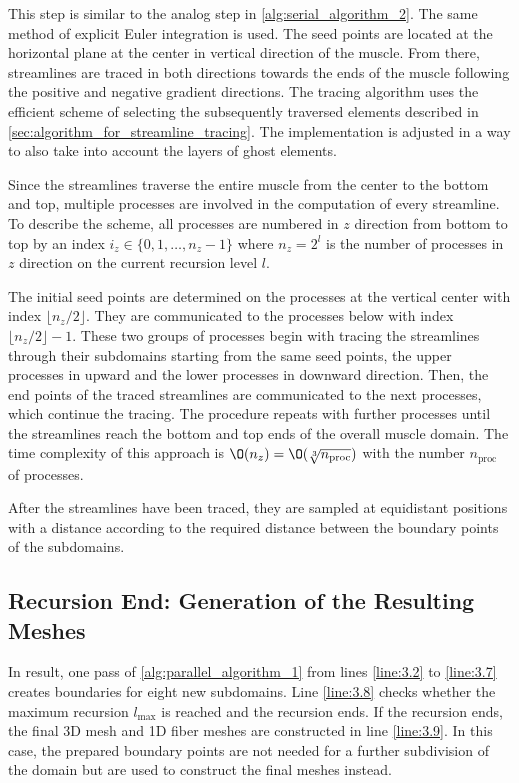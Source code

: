 This step is similar to the analog step in \cref{alg:serial_algorithm_2}. 
The same method of explicit Euler integration is used. The seed points are located at the horizontal plane at the center in vertical direction of the muscle. From there, streamlines are traced in both directions towards the ends of the muscle following the positive and negative gradient directions.
The tracing algorithm uses the efficient scheme of selecting the subsequently traversed elements described in \cref{sec:algorithm_for_streamline_tracing}. The implementation is adjusted in a way to also take into account the layers of ghost elements.

Since the streamlines traverse the entire muscle from the center to the bottom and top, multiple processes are involved in the computation of every streamline. To describe the scheme, all processes are numbered in $z$ direction from bottom to top by an index $i_z \in \{0, 1, \dots, n_z-1\}$ where $n_z = 2^l$ is the number of processes in $z$ direction on the current recursion level $l$.

The initial seed points are determined on the processes at the vertical center with index $\lfloor n_z/2\rfloor$. They are communicated to the processes below with index $\lfloor n_z/2\rfloor-1$. These two groups of processes begin with tracing the streamlines through their subdomains starting from the same seed points, the upper processes in upward and the lower processes in downward direction. Then, the end points of the traced streamlines are communicated to the next processes, which continue the tracing. The procedure repeats with further processes until the streamlines reach the bottom and top ends of the overall muscle domain.
The time complexity of this approach is $\O(n_z) = \O(\sqrt[3]{n_\text{proc}})$ with the number $n_\text{proc}$ of processes.

After the streamlines have been traced, they are sampled at equidistant positions with a distance according to the required distance between the boundary points of the subdomains.

\subsection{Recursion End: Generation of the Resulting Meshes}

In result, one pass of \cref{alg:parallel_algorithm_1} from lines \ref{line:3.2} to \ref{line:3.7} creates boundaries for eight new subdomains. Line \ref{line:3.8} checks whether the maximum recursion $l_\text{max}$ is reached and the recursion ends. If the recursion ends, the final 3D mesh and 1D fiber meshes are constructed in line \ref{line:3.9}. In this case, the prepared boundary points are not needed for a further subdivision of the domain but are used to construct the final meshes instead.

